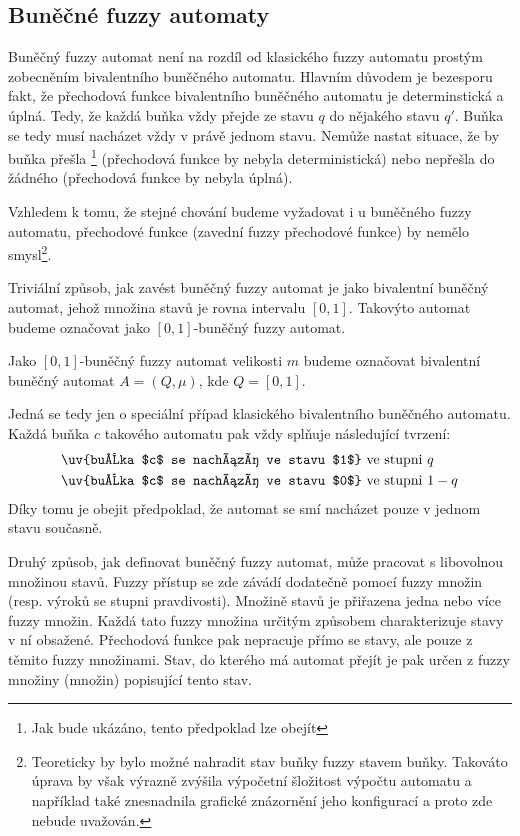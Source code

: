 \documentclass[a4paper,10pt]{article}
\begin{document}
\subsection{Buněčné fuzzy automaty}
Buněčný fuzzy automat není na rozdíl od klasického fuzzy automatu prostým zobecněním bivalentního buněčného automatu. Hlavním důvodem je bezesporu fakt, že přechodová funkce bivalentního buněčného automatu je determinstická a úplná. Tedy, že každá buňka vždy přejde ze stavu $q$ do nějakého stavu $q'$. Buňka se tedy musí nacházet vždy v právě jednom stavu. Nemůže nastat situace, že by buňka přešla \footnote{Jak bude ukázáno, tento předpoklad lze obejít} (přechodová funkce by nebyla deterministická) nebo nepřešla do žádného (přechodová funkce by nebyla úplná).

Vzhledem k tomu, že stejné chování budeme vyžadovat i u buněčného fuzzy automatu,  přechodové funkce (zavední fuzzy přechodové funkce) by nemělo smysl\footnote{Teoreticky by bylo možné nahradit stav buňky fuzzy stavem buňky. Takováto úprava by však výrazně zvýšila výpočetní šložitost výpočtu automatu a například také znesnadnila grafické znázornění jeho konfigurací a proto zde nebude uvažován.}.

Triviální způsob, jak zavést buněčný fuzzy automat je jako bivalentní buněčný automat, jehož množina stavů je rovna intervalu $[0,1]$. Takovýto automat budeme označovat jako $[0,1]$-buněčný fuzzy automat.

\begin{definition}
 Jako $[0,1]$-buněčný fuzzy automat velikosti $m$ budeme označovat bivalentní buněčný automat $A = (Q, \mu)$, kde $Q = [0,1]$.
\end{definition}

Jedná se tedy jen o speciální případ klasického bivalentního buněčného automatu. Každá buňka $c$ takového automatu pak vždy splňuje následující tvrzení:
\begin{align*}
  & \text{\uv{buňka $c$ se nachází ve stavu $1$} ve stupni $q$}	\\
  & \text{\uv{buňka $c$ se nachází ve stavu $0$} ve stupni $1 - q$}
\end{align*}
Díky tomu je obejit předpoklad, že automat se smí nacházet pouze v jednom stavu současně.

Druhý způsob, jak definovat buněčný fuzzy automat, může pracovat s libovolnou množinou stavů. Fuzzy přístup se zde závádí dodatečně pomocí fuzzy množin (resp. výroků se stupni pravdivosti). Množině stavů je přiřazena jedna nebo více fuzzy množin. Každá tato fuzzy množina určitým způsobem charakterizuje stavy v ní obsažené. Přechodová funkce pak nepracuje přímo se stavy, ale pouze z těmito fuzzy množinami. Stav, do kterého má automat přejít je pak určen z fuzzy množiny (množin) popisující tento stav.
\end{document}
